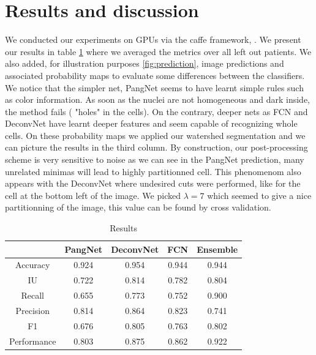 \documentclass{article}
\begin{document}
\section{Results and discussion}
\label{sec:result}
\noindent We conducted our experiments on GPUs via the caffe framework, 
\cite{jia2014caffe}. We present our results in table \ref{tab:res} where 
we averaged the metrics over all left out patients. We also added, for 
illustration purposes \ref{fig:prediction}, image predictions and 
associated 
probability maps to evaluate some differences between the classifiers. 
We notice that the simpler net, PangNet seems to have learnt simple 
rules such as color information. As soon as the nuclei are not
homogeneous and dark inside, the method fails ( "holes" in the
cells). On the 
contrary, deeper nets as FCN and DeconvNet have learnt deeper features 
and seem capable of recognizing whole cells. On these probability maps 
we applied our watershed segmentation and we can picture the results in 
the third 
column. By construction, our post-processing 
scheme is very sensitive to noise as we can see in the PangNet 
prediction, many unrelated minimas will lead to highly partitionned cell. 
This phenomenom also appears with the DeconvNet where undesired 
cuts were performed, like for the cell at the bottom left of the image. 
We picked $\lambda = 7$ which seemed to give a nice partitionning of 
the image, this value can be found by cross validation.
\begin{table}
\begin{tabular}{|c|c|c|c|c|}
\hline
  & PangNet & DeconvNet & FCN & Ensemble\\
 \hline
Accuracy  &  0.924 & 0.954 &0.944 & 0.944  \\
IU   &    0.722 &  0.814 & 0.782 & 0.804 \\
Recall     &  0.655  & 0.773 & 0.752 & 0.900 \\
Precision   &  0.814 & 0.864 & 0.823 & 0.741 \\
F1    &       0.676 &     0.805 & 0.763  & 0.802\\
Performance    &   0.803   & 0.875 & 0.862 & 0.922 \\
\hline
\end{tabular}
\caption{Results}
\label{tab:res}
\end{table}
\end{document}
